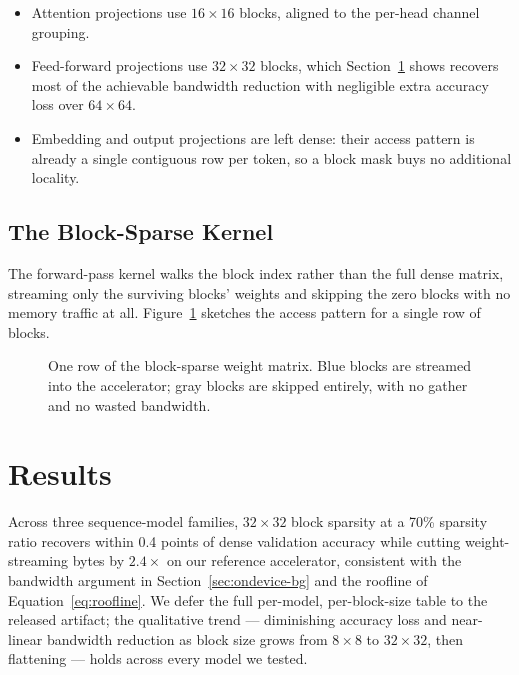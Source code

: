 \documentclass[11pt,twoside]{book}
\begin{document}
\begin{itemize}
  \item Attention projections use \(16\times 16\) blocks, aligned to the
    per-head channel grouping.
  \item Feed-forward projections use \(32\times 32\) blocks, which
    Section~\ref{sec:results} shows recovers most of the achievable
    bandwidth reduction with negligible extra accuracy loss over
    \(64\times 64\).
  \item Embedding and output projections are left dense: their access
    pattern is already a single contiguous row per token, so a block
    mask buys no additional locality.
\end{itemize}

\subsection{The Block-Sparse Kernel}
\label{sec:kernel}

The forward-pass kernel walks the block index rather than the full dense
matrix, streaming only the surviving blocks' weights and skipping the
zero blocks with no memory traffic at all. Figure~\ref{fig:kernel-diagram}
sketches the access pattern for a single row of blocks.

\begin{figure}[t]
  \centering
  \caption{One row of the block-sparse weight matrix. Blue blocks are
    streamed into the accelerator; gray blocks are skipped entirely, with
    no gather and no wasted bandwidth.}
  \label{fig:kernel-diagram}
\end{figure}

\section{Results}
\label{sec:results}

Across three sequence-model families, \(32\times 32\) block sparsity at
a 70\% sparsity ratio recovers within 0.4 points of dense validation
accuracy while cutting weight-streaming bytes by \(2.4\times\) on our
reference accelerator, consistent with the bandwidth argument in
Section~\ref{sec:ondevice-bg} and the roofline of
Equation~\ref{eq:roofline}. We defer the full per-model, per-block-size
table to the released artifact; the qualitative trend --- diminishing
accuracy loss and near-linear bandwidth reduction as block size grows
from \(8\times 8\) to \(32\times 32\), then flattening --- holds across
every model we tested.
\end{document}
